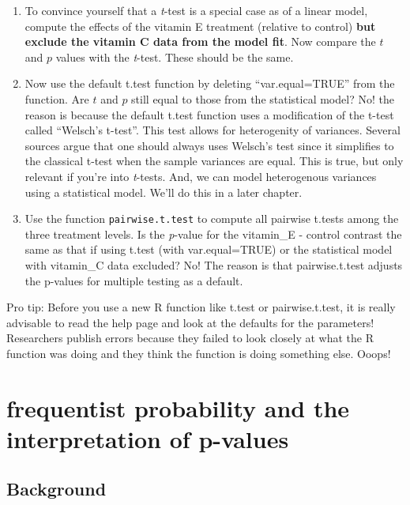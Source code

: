 \documentclass[]{book}
\begin{document}
\begin{enumerate}
\def\labelenumi{\arabic{enumi}.}
\setcounter{enumi}{2}
\item
  To convince yourself that a \emph{t}-test is a special case as of a linear model, compute the effects of the vitamin E treatment (relative to control) \textbf{but exclude the vitamin C data from the model fit}. Now compare the \(t\) and \(p\) values with the \emph{t}-test. These should be the same.
\item
  Now use the default t.test function by deleting ``var.equal=TRUE'' from the function. Are \(t\) and \(p\) still equal to those from the statistical model? No! the reason is because the default t.test function uses a modification of the t-test called ``Welsch's t-test''. This test allows for heterogenity of variances. Several sources argue that one should always uses Welsch's test since it simplifies to the classical t-test when the sample variances are equal. This is true, but only relevant if you're into \emph{t}-tests. And, we can model heterogenous variances using a statistical model. We'll do this in a later chapter.
\item
  Use the function \texttt{pairwise.t.test} to compute all pairwise t.tests among the three treatment levels. Is the \emph{p}-value for the vitamin\_E - control contrast the same as that if using t.test (with var.equal=TRUE) or the statistical model with vitamin\_C data excluded? No! The reason is that pairwise.t.test adjusts the p-values for multiple testing as a default.
\end{enumerate}

Pro tip: Before you use a new R function like t.test or pairwise.t.test, it is really advisable to read the help page and look at the defaults for the parameters! Researchers publish errors because they failed to look closely at what the R function was doing and they think the function is doing something else. Ooops!

\hypertarget{frequentist-probability-and-the-interpretation-of-p-values}{%
\section{frequentist probability and the interpretation of p-values}\label{frequentist-probability-and-the-interpretation-of-p-values}}

\hypertarget{background}{%
\subsection{Background}\label{background}}
\end{document}
